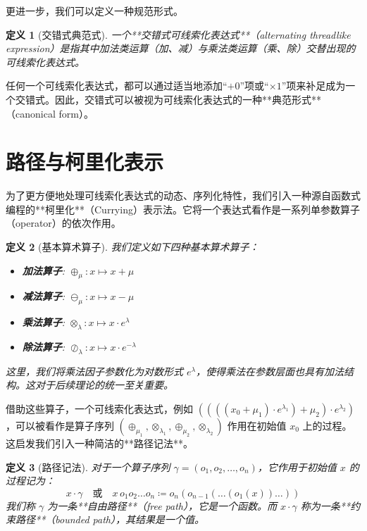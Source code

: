 \documentclass[a4paper,12pt]{book}
\numberwithin{problem}{section}
\newtheorem{definition}{定义}
\numberwithin{definition}{section}
\numberwithin{lemma}{section}
\numberwithin{proposition}{section}
\numberwithin{theorem}{section}
\numberwithin{grammar}{section}
\numberwithin{program}{section}
\numberwithin{convention}{section}
\numberwithin{corollary}{section}
\begin{document}
更进一步，我们可以定义一种规范形式。

\begin{definition}[交错式典范式]
    \label{def:alternating_canonical_form}
    一个**交错式可线索化表达式**（alternating threadlike expression）是指其中加法类运算（加、减）与乘法类运算（乘、除）交替出现的可线索化表达式。
\end{definition}

任何一个可线索化表达式，都可以通过适当地添加“$+0$”项或“$\times 1$”项来补足成为一个交错式。因此，交错式可以被视为可线索化表达式的一种**典范形式**（canonical form）。

\section{路径与柯里化表示}
\label{sec:path_and_currying}

为了更方便地处理可线索化表达式的动态、序列化特性，我们引入一种源自函数式编程的**柯里化**（Currying）表示法。它将一个表达式看作是一系列单参数算子（operator）的依次作用。

\begin{definition}[基本算术算子]
    \label{def:arithmetic_operators}
    我们定义如下四种基本算术算子：
    \begin{itemize}
        \item \textbf{加法算子}: $\oplus_\mu: x \mapsto x + \mu$
        \item \textbf{减法算子}: $\ominus_\mu: x \mapsto x - \mu$
        \item \textbf{乘法算子}: $\otimes_\lambda: x \mapsto x \cdot e^\lambda$
        \item \textbf{除法算子}: $\oslash_\lambda: x \mapsto x \cdot e^{-\lambda}$
    \end{itemize}
    这里，我们将乘法因子参数化为对数形式 $e^\lambda$，使得乘法在参数层面也具有加法结构。这对于后续理论的统一至关重要。
\end{definition}

借助这些算子，一个可线索化表达式，例如 $((((x_0 + \mu_1) \cdot e^{\lambda_1}) + \mu_2) \cdot e^{\lambda_2})$，可以被看作是算子序列 $(\oplus_{\mu_1}, \otimes_{\lambda_1}, \oplus_{\mu_2}, \otimes_{\lambda_2})$ 作用在初始值 $x_0$ 上的过程。这启发我们引入一种简洁的**路径记法**。

\begin{definition}[路径记法]
    \label{def:path_notation}
    对于一个算子序列 $\gamma = (o_1, o_2, \dots, o_n)$，它作用于初始值 $x$ 的过程记为：
    \[ x \cdot \gamma \quad \text{或} \quad x \, o_1 o_2 \dots o_n \coloneqq o_n(o_{n-1}(\dots(o_1(x))\dots)) \]
    我们称 $\gamma$ 为一条**自由路径**（free path），它是一个函数。而 $x \cdot \gamma$ 称为一条**约束路径**（bounded path），其结果是一个值。
\end{definition}
\end{document}
